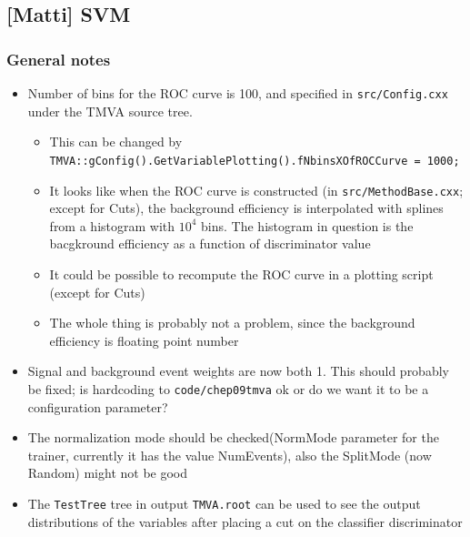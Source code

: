 \subsection{[Matti] SVM}

\subsubsection{General notes}
\begin{itemize}
\item Number of bins for the ROC curve is 100, and specified in
  \texttt{src/Config.cxx} under the TMVA source tree.
  \begin{itemize}
  \item This can be changed by \texttt{TMVA::gConfig().GetVariablePlotting().fNbinsXOfROCCurve = 1000;}
  \item It looks like when the ROC curve is constructed (in
    \texttt{src/MethodBase.cxx}; except for Cuts), the background
    efficiency is interpolated with splines from a histogram with
    $10^4$ bins. The histogram in question is the bacgkround
    efficiency as a function of discriminator value
  \item It could be possible to recompute the ROC curve in a plotting
    script (except for Cuts)
  \item The whole thing is probably not a problem, since the
    background efficiency is floating point number
  \end{itemize}
\item Signal and background event weights are now both 1. This should
  probably be fixed; is hardcoding to \texttt{code/chep09tmva} ok or
  do we want it to be a configuration parameter?
\item The normalization mode should be checked(NormMode parameter for
  the trainer, currently it has the value NumEvents), also the
  SplitMode (now Random) might not be good
\item The \texttt{TestTree} tree in output \texttt{TMVA.root} can be
  used to see the output distributions of the variables after placing
  a cut on the classifier discriminator
  \begin{itemize}

\end{itemize}
\end{itemize}
